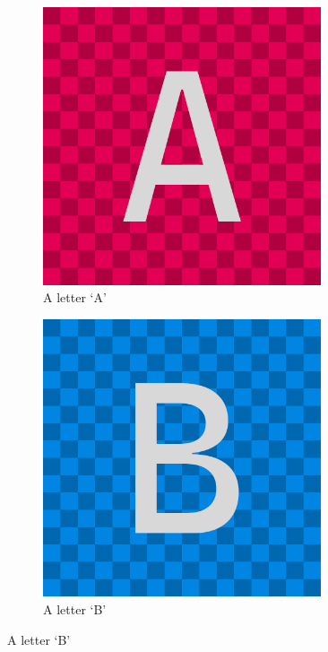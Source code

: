\documentclass[a4paper, 11pt]{article}
\begin{document}
\kant[4-5]

\begin{figure}[htbp]
    \centering
    \begin{subfigure}{0.45\textwidth}
        \centering
        \includegraphics[width=0.9\textwidth]{ImageA}
        \caption{A letter `A'}
        \label{fig:subA}
    \end{subfigure}
    \hfill
    \begin{subfigure}{0.45\textwidth}
        \centering
        \includegraphics[width=0.9\textwidth]{ImageB}
        \caption{A letter `B'}
        \label{fig:subB}
    \end{subfigure}


\end{figure}
\end{document}
